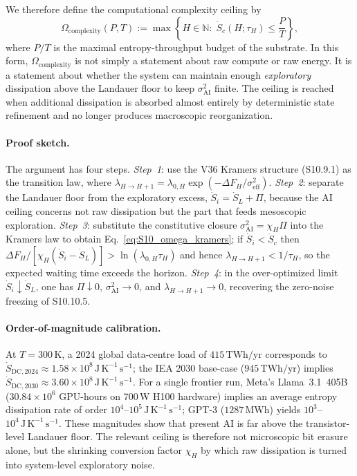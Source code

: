 \documentclass[11pt]{article}
\begin{document}
We therefore define the computational complexity ceiling by
\begin{equation}
\Omega_{\mathrm{complexity}}(P,T)
:=
\max\left\{
H\in\mathbb N:\;
\dot S_c(H;\tau_H)\le \frac{P}{T}
\right\},
\label{eq:S10_omega_complexity}
\end{equation}
where $P/T$ is the maximal entropy-throughput budget of the substrate.
In this form, $\Omega_{\mathrm{complexity}}$ is not simply a statement about
raw compute or raw energy.
It is a statement about whether the system can maintain enough
\emph{exploratory} dissipation above the Landauer floor to keep
$\sigma_{\mathrm{AI}}^2$ finite.
The ceiling is reached when additional dissipation is absorbed almost
entirely by deterministic state refinement and no longer produces
macroscopic reorganization.

\paragraph{Proof sketch.}
The argument has four steps.
\emph{Step~1}: use the V36 Kramers structure (S10.9.1) as the transition law, where
$\lambda_{H\to H+1}=\lambda_{0,H}\exp(-\Delta F_H/\sigma_{\mathrm{eff}}^2)$.
\emph{Step~2}: separate the Landauer floor from the exploratory excess,
$\dot S_i=\dot S_L+\Pi$, because the AI ceiling concerns not raw dissipation
but the part that feeds mesoscopic exploration.
\emph{Step~3}: substitute the constitutive closure
$\sigma_{\mathrm{AI}}^2=\chi_H\Pi$ into the Kramers law to obtain
Eq.~\eqref{eq:S10_omega_kramers}; if $\dot S_i<\dot S_c$ then
$\Delta F_H/[\chi_H(\dot S_i-\dot S_L)]>\ln(\lambda_{0,H}\tau_H)$ and hence
$\lambda_{H\to H+1}<1/\tau_H$, so the expected waiting time exceeds the
horizon.
\emph{Step~4}: in the over-optimized limit $\dot S_i\downarrow\dot S_L$,
one has $\Pi\downarrow 0$, $\sigma_{\mathrm{AI}}^2\to 0$, and
$\lambda_{H\to H+1}\to 0$, recovering the zero-noise freezing of S10.10.5.

\paragraph{Order-of-magnitude calibration.}
At $T=300\,\mathrm{K}$, a 2024 global data-centre load of $415\,\mathrm{TWh/yr}$
corresponds to
$\dot S_{\mathrm{DC},2024}\approx 1.58\times10^8\,\mathrm{J\,K^{-1}\,s^{-1}}$;
the IEA 2030 base-case ($945\,\mathrm{TWh/yr}$) implies
$\dot S_{\mathrm{DC},2030}\approx 3.60\times10^8\,\mathrm{J\,K^{-1}\,s^{-1}}$.
For a single frontier run, Meta's Llama~3.1~405B ($30.84\times10^6$ GPU-hours
on 700\,W H100 hardware) implies an average entropy dissipation rate of order
$10^4$--$10^5\,\mathrm{J\,K^{-1}\,s^{-1}}$;
GPT-3 ($1287\,\mathrm{MWh}$) yields $10^3$--$10^4\,\mathrm{J\,K^{-1}\,s^{-1}}$.
These magnitudes show that present AI is far above the transistor-level
Landauer floor.  The relevant ceiling is therefore not microscopic bit
erasure alone, but the shrinking conversion factor $\chi_H$ by which raw
dissipation is turned into system-level exploratory noise.
\end{document}
